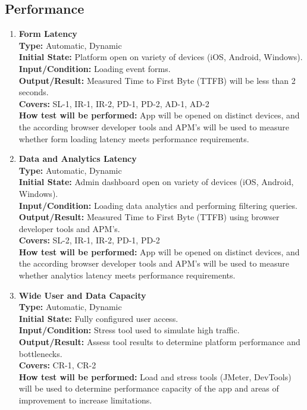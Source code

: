 \documentclass[12pt, titlepage]{article}
\begin{document}
\subsection{Performance}
\begin{enumerate}[label=\bfseries PF-\arabic*:, wide=0pt]
  \item \label{test-PF1} \textbf{Form Latency}\\[2mm]
    {\bf Type:} Automatic, Dynamic\\
    {\bf Initial State:} Platform open on variety of devices (iOS, Android, Windows).\\
    {\bf Input/Condition:} Loading event forms.\\
    {\bf Output/Result:} Measured Time to First Byte (TTFB) will be less than 2 seconds.\\
    {\bf Covers:} SL-1, IR-1, IR-2, PD-1, PD-2, AD-1, AD-2\\
    {\bf How test will be performed:} App will be opened on distinct devices, and the according browser developer tools and APM's will be used to measure whether form loading latency meets performance requirements.

  \item \label{test-PF2} \textbf{Data and Analytics Latency}\\[2mm]
    {\bf Type:} Automatic, Dynamic\\
    {\bf Initial State:} Admin dashboard open on variety of devices (iOS, Android, Windows).\\
    {\bf Input/Condition:} Loading data analytics and performing filtering queries.\\
    {\bf Output/Result:} Measured Time to First Byte (TTFB) using browser developer tools and APM's.\\
    {\bf Covers:} SL-2, IR-1, IR-2, PD-1, PD-2\\
    {\bf How test will be performed:} App will be opened on distinct devices, and the according browser developer tools and APM's will be used to measure whether analytics latency meets performance requirements.

  \item \label{test-PF4} \textbf{Wide User and Data Capacity}\\[2mm]
    {\bf Type:} Automatic, Dynamic\\
    {\bf Initial State:} Fully configured user access.\\
    {\bf Input/Condition:} Stress tool used to simulate high traffic.\\
    {\bf Output/Result:} Assess tool results to determine platform performance and bottlenecks.\\
    {\bf Covers:} CR-1, CR-2\\
    {\bf How test will be performed:} Load and stress tools (JMeter, DevTools) will be used to determine performance capacity of the app and areas of improvement to increase limitations.


\end{enumerate}
\end{document}
